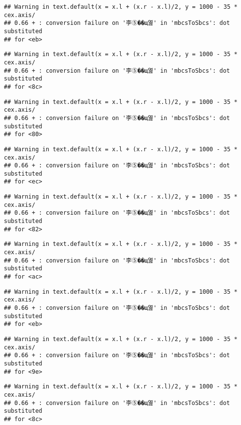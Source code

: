 \documentclass[]{article}
\begin{document}
\begin{verbatim}
## Warning in text.default(x = x.l + (x.r - x.l)/2, y = 1000 - 35 * cex.axis/
## 0.66 + : conversion failure on '李⑤��щ엺' in 'mbcsToSbcs': dot substituted
## for <eb>
\end{verbatim}

\begin{verbatim}
## Warning in text.default(x = x.l + (x.r - x.l)/2, y = 1000 - 35 * cex.axis/
## 0.66 + : conversion failure on '李⑤��щ엺' in 'mbcsToSbcs': dot substituted
## for <8c>
\end{verbatim}

\begin{verbatim}
## Warning in text.default(x = x.l + (x.r - x.l)/2, y = 1000 - 35 * cex.axis/
## 0.66 + : conversion failure on '李⑤��щ엺' in 'mbcsToSbcs': dot substituted
## for <80>
\end{verbatim}

\begin{verbatim}
## Warning in text.default(x = x.l + (x.r - x.l)/2, y = 1000 - 35 * cex.axis/
## 0.66 + : conversion failure on '李⑤��щ엺' in 'mbcsToSbcs': dot substituted
## for <ec>
\end{verbatim}

\begin{verbatim}
## Warning in text.default(x = x.l + (x.r - x.l)/2, y = 1000 - 35 * cex.axis/
## 0.66 + : conversion failure on '李⑤��щ엺' in 'mbcsToSbcs': dot substituted
## for <82>
\end{verbatim}

\begin{verbatim}
## Warning in text.default(x = x.l + (x.r - x.l)/2, y = 1000 - 35 * cex.axis/
## 0.66 + : conversion failure on '李⑤��щ엺' in 'mbcsToSbcs': dot substituted
## for <ac>
\end{verbatim}

\begin{verbatim}
## Warning in text.default(x = x.l + (x.r - x.l)/2, y = 1000 - 35 * cex.axis/
## 0.66 + : conversion failure on '李⑤��щ엺' in 'mbcsToSbcs': dot substituted
## for <eb>
\end{verbatim}

\begin{verbatim}
## Warning in text.default(x = x.l + (x.r - x.l)/2, y = 1000 - 35 * cex.axis/
## 0.66 + : conversion failure on '李⑤��щ엺' in 'mbcsToSbcs': dot substituted
## for <9e>
\end{verbatim}

\begin{verbatim}
## Warning in text.default(x = x.l + (x.r - x.l)/2, y = 1000 - 35 * cex.axis/
## 0.66 + : conversion failure on '李⑤��щ엺' in 'mbcsToSbcs': dot substituted
## for <8c>
\end{verbatim}
\end{document}
